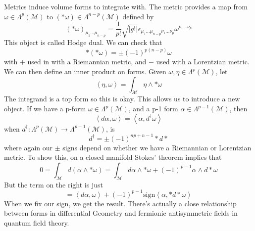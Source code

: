 \begin{claim}{Metrics induce volume forms to integrate with.}
The metric provides a map from $ \omega  \in \Lambda^p ( \mathcal{ M } ) $
to $ ( * \omega ) \in \Lambda ^{ n - p } ( \mathcal{ M } ) $  defined by
\[
 ( * \omega )_{ \mu_1 \dots \mu_{ n - p }  } = \frac{1}{p! } \sqrt{  | g ! | }  \epsilon_{ \mu_1 \dots \mu_{ n - p } \nu_1 \dots \nu_{ p } } \omega^{ \nu_1 \dots \nu_{ p } }
\] This object is called Hodge dual. We can check that 
\[
	* ( * \omega ) = \pm ( -1) ^{ p ( n - p ) } \omega 
\] with $ + $ used in with a Riemannian metric, and $ - $ used 
with a Lorentzian metric. 
We can then define an inner product on forms. 
Given $ \omega, \eta \in \Lambda ^ p ( \mathcal{ M } ) $, let
\[
 \left< \eta , \omega  \right>  = \int_{ \mathcal{ M } } \eta \wedge  * \omega 
\] The integrand is a top form so this is okay. 
This allows us to introduce a new object. 
If we have a p-form $ \omega \in \Lambda ^ p ( \mathcal{ M } ) $, and a 
p-1 form $ \alpha \in \Lambda ^{ p - 1 }( \mathcal{ M } )  $, then 
\[
 \left< d\alpha, \omega    \right> = \left< \alpha, d^ \dagger \omega \right>
\] when $ d ^ \dagger : \Lambda ^ p ( \mathcal{ M } ) \to \Lambda ^{ p -1 } ( \mathcal{ M } ) $, is 
\[
 d^ \dagger  = \pm ( - 1)^{ np + n - 1 } * d * 
\] where again our $ \pm $ signs depend on whether we have 
a Riemannian or Lorentzian metric. 
To show this, on a closed manifold Stokes' theorem implies that 
\[
	0 = \int_{ \mathcal{ M } } d ( \alpha \wedge  * \omega )  = \int_{ \mathcal{ M } } d \alpha \wedge  * \omega + ( - 1) ^{ p - 1 }\alpha \wedge  d * \omega 
\] But the term on the right is just 
\[
	= \left< d\alpha , \omega  \right> + ( - 1 ) ^{ p - 1 } \text{sign} \left<\alpha, * d * \omega  \right>
\] When we fix our sign, we 
get the result. 
There's actually a close relationship between forms in differential 
Geometry and fermionic antisymmetric fields in quantum field theory.
\end{claim} 

